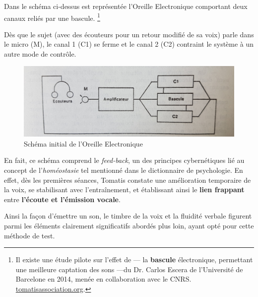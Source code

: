 Dans le schéma ci-dessus est représentée l'Oreille Electronique
comportant deux canaux reliés par une bascule. \autocite{escera-key}\footnote{Il existe une étude pilote sur l'effet de 
--- la \textbf{bascule} \label{bascule} électronique, permettant une meilleure
captation des sons ---du Dr. Carlos Escera
de l'Université de Barcelone en 2014, menée en collaboration avec le CNRS.
\href{http://tomatisassociation.org/scientific-validation-of-the-tomatis-effect-
eeg-recordings-of-sound-from-brainstem-to-cerebral-cortex-encoding-university-of
-barcelona-2014/}{tomatisassociation.org}.}

Dès que le sujet (avec
des écouteurs pour un retour modifié de sa voix) parle
dans le micro (M), le canal 1 (C1) se ferme et  le canal 2 (C2) contraint le
système à un autre mode de contrôle.

\begin{figure}
	\centering
	\includegraphics[width=0.7\linewidth]{images/oreilleelectro.jpg}
	\caption[oreilleelectro]{Schéma initial de l'Oreille
          Electronique}
       
	\label{oreilleelectro}
\end{figure}
En fait, ce schéma comprend le\textit{ feed-back}, un des principes
cybernétiques lié au concept de l'\textit{homéostasie} tel
mentionné dans le dictionnaire de
psychologie\autocite[298]{doronparot}.
En effet, dès les premières
séances, Tomatis constate une amélioration temporaire de la voix, se
stabilisant avec l'entraînement, et établissant ainsi le
\textbf{lien frappant} entre \textbf{ l'écoute et
  l'émission vocale}.

Ainsi la façon d'émettre un son, le timbre de la voix et la fluidité
verbale figurent parmi les
éléments clairement significatifs abordés plus loin, ayant opté pour
cette méthode de test.
